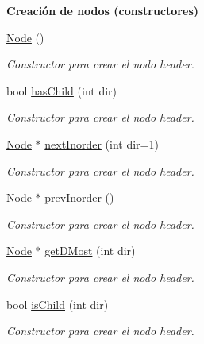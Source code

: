 \begin{Indent}{\bf Creación de nodos (constructores)}\par
\begin{DoxyCompactItemize}
\item 
\hyperlink{structaed2_1_1map_1_1Node_a9c1a600491066ce7eb669b1cb76d56c6_a9c1a600491066ce7eb669b1cb76d56c6}{Node} ()
\begin{DoxyCompactList}\small\item\em Constructor para crear el nodo header. \end{DoxyCompactList}\item 
bool \hyperlink{structaed2_1_1map_1_1Node_a7156a65bc1ffc8fd6c8548e437bc2e43_a7156a65bc1ffc8fd6c8548e437bc2e43}{has\+Child} (int dir)
\begin{DoxyCompactList}\small\item\em Constructor para crear el nodo header. \end{DoxyCompactList}\item 
\hyperlink{structaed2_1_1map_1_1Node}{Node} $\ast$ \hyperlink{structaed2_1_1map_1_1Node_a6b8023794e29d91caa7fc48ecf548877_a6b8023794e29d91caa7fc48ecf548877}{next\+Inorder} (int dir=1)
\begin{DoxyCompactList}\small\item\em Constructor para crear el nodo header. \end{DoxyCompactList}\item 
\hyperlink{structaed2_1_1map_1_1Node}{Node} $\ast$ \hyperlink{structaed2_1_1map_1_1Node_ace5f2727ac92ec79323155a3f0f761fb_ace5f2727ac92ec79323155a3f0f761fb}{prev\+Inorder} ()
\begin{DoxyCompactList}\small\item\em Constructor para crear el nodo header. \end{DoxyCompactList}\item 
\hyperlink{structaed2_1_1map_1_1Node}{Node} $\ast$ \hyperlink{structaed2_1_1map_1_1Node_afc97d72bfcc58f0dbe8f2d5b03950dc8_afc97d72bfcc58f0dbe8f2d5b03950dc8}{get\+D\+Most} (int dir)
\begin{DoxyCompactList}\small\item\em Constructor para crear el nodo header. \end{DoxyCompactList}\item 
bool \hyperlink{structaed2_1_1map_1_1Node_a955064010744e4e9964a48f8889675ae_a955064010744e4e9964a48f8889675ae}{is\+Child} (int dir)
\begin{DoxyCompactList}\small\item\em Constructor para crear el nodo header. \end{DoxyCompactList}\item 

\end{DoxyCompactItemize}
\end{Indent}
